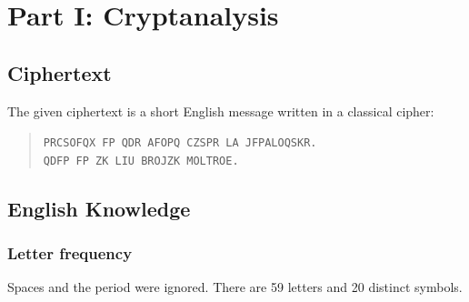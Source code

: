 

    \section{Part I: Cryptanalysis}

        \subsection{Ciphertext}

            The given ciphertext is a short English message written in a classical cipher:
            \begin{quote}
                \texttt{PRCSOFQX FP QDR AFOPQ CZSPR LA JFPALOQSKR.}\\
                \texttt{QDFP FP ZK LIU BROJZK MOLTROE.}
            \end{quote}

        \subsection{English Knowledge}
            
            \subsubsection{Letter frequency}

                Spaces and the period were ignored. There are 59 letters and 20 distinct symbols.

